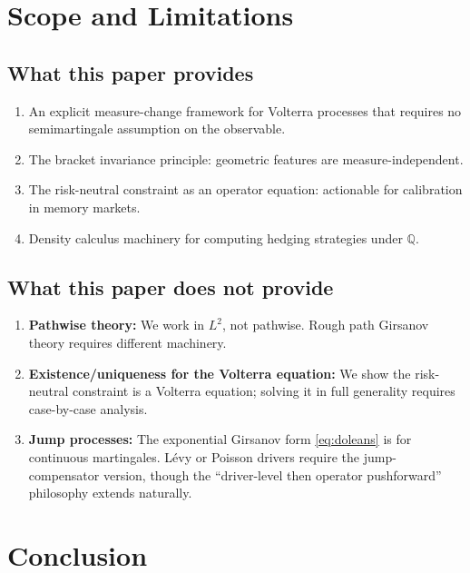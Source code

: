 \documentclass[11pt]{article}
\theoremstyle{plain}
\theoremstyle{definition}
\theoremstyle{remark}
\newcommand{\QQ}{\mathbb{Q}}
\begin{document}
\section{Scope and Limitations}\label{sec:limitations}

\subsection{What this paper provides}

\begin{enumerate}
\item An explicit measure-change framework for Volterra processes that requires no
semimartingale assumption on the observable.
\item The bracket invariance principle: geometric features are measure-independent.
\item The risk-neutral constraint as an operator equation: actionable for
calibration in memory markets.
\item Density calculus machinery for computing hedging strategies under $\QQ$.
\end{enumerate}

\subsection{What this paper does not provide}

\begin{enumerate}
\item \textbf{Pathwise theory:} We work in $L^2$, not pathwise. Rough path
Girsanov theory requires different machinery.
\item \textbf{Existence/uniqueness for the Volterra equation:} We show the
risk-neutral constraint is a Volterra equation; solving it in full generality
requires case-by-case analysis.
\item \textbf{Jump processes:} The exponential Girsanov form \eqref{eq:doleans}
is for continuous martingales. L\'evy or Poisson drivers require the
jump-compensator version, though the ``driver-level then operator pushforward''
philosophy extends naturally.
\end{enumerate}

\section{Conclusion}\label{sec:conclusion}
\end{document}
